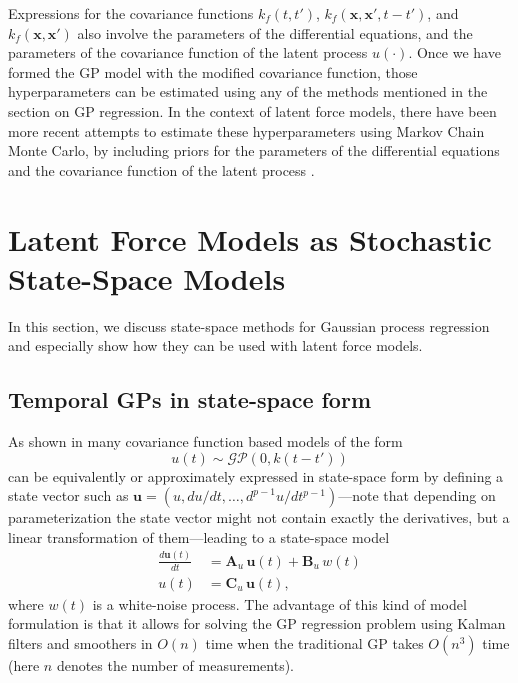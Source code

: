 \documentclass[journal]{IEEEtran}
\begin{document}
Expressions for the covariance functions $k_{f}(t,t')$, $k_{f}(\mathbf{x}, \mathbf{x}', t-t')$, and $k_{f}(\mathbf{x}, \mathbf{x}')$ also involve the parameters of the differential equations, and the parameters of the covariance function of the latent process $u(\cdot)$. Once we have formed the GP model with the modified covariance function, those hyperparameters can be estimated using any of the methods mentioned in the section on GP regression. In the context of latent force models, there have been more recent
attempts to estimate these hyperparameters using Markov Chain Monte Carlo, by including priors for the parameters of the differential equations and the covariance function of the latent process \cite{Titsias:control:vars:2009, Titsias:BMC:2012}.


\section{Latent Force Models as Stochastic State-Space Models}

In this section, we discuss state-space methods for Gaussian process regression and especially show how they can be used with latent force models. 

\subsection{Temporal GPs in state-space form} \label{sec:tempgp}
As shown in \cite{Hartikainen+Sarkka:2010,Sarkka+Solin+Hartikainen:2013,Sarkka+Piche:2014} many covariance function based models of the form
%
\begin{equation}
  u(t) \sim \mathcal{GP}(0,k(t - t'))
\end{equation}
%
can be equivalently or approximately expressed in state-space form by defining a state vector such as $\mathbf{u} = (u,
du/dt,\ldots,d^{p-1}u/dt^{p-1})$---note that depending on parameterization the state vector might not contain exactly
the derivatives, but a linear transformation of them---leading to a state-space model
%
\begin{equation}
\begin{split}
  \frac{d\mathbf{u}(t)}{dt}
  &= \mathbf{A}_u \, \mathbf{u}(t) + \mathbf{B}_u \, w(t) \\
  u(t) &= \mathbf{C}_u \, \mathbf{u}(t),
\end{split}
\label{eq:ssu}
\end{equation}
%
where $w(t)$ is a white-noise process. The advantage of this kind of model formulation is that it allows for solving the GP regression problem using Kalman filters and smoothers \cite{Sarkka:2013} in $O(n)$ time when the traditional GP takes $O(n^3)$ time (here $n$ denotes the number of measurements).
\end{document}
